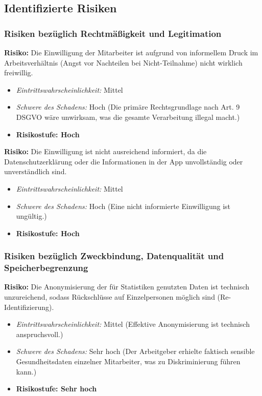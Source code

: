 \documentclass[12pt, a4paper]{article}
\begin{document}
\subsection{Identifizierte Risiken}

\subsubsection{Risiken bezüglich Rechtmäßigkeit und Legitimation}
\textbf{Risiko:} Die Einwilligung der Mitarbeiter ist aufgrund von informellem Druck im Arbeitsverhältnis (Angst vor Nachteilen bei Nicht-Teilnahme) nicht wirklich freiwillig.
\begin{itemize}
    \item \textit{Eintrittswahrscheinlichkeit:} Mittel
    \item \textit{Schwere des Schadens:} Hoch (Die primäre Rechtsgrundlage nach Art. 9 DSGVO wäre unwirksam, was die gesamte Verarbeitung illegal macht.)
    \item \textbf{Risikostufe: Hoch}
\end{itemize}

\textbf{Risiko:} Die Einwilligung ist nicht ausreichend informiert, da die Datenschutzerklärung oder die Informationen in der App unvollständig oder unverständlich sind.
\begin{itemize}
    \item \textit{Eintrittswahrscheinlichkeit:} Mittel
    \item \textit{Schwere des Schadens:} Hoch (Eine nicht informierte Einwilligung ist ungültig.)
    \item \textbf{Risikostufe: Hoch}
\end{itemize}

\subsubsection{Risiken bezüglich Zweckbindung, Datenqualität und Speicherbegrenzung}
\textbf{Risiko:} Die Anonymisierung der für Statistiken genutzten Daten ist technisch unzureichend, sodass Rückschlüsse auf Einzelpersonen möglich sind (Re-Identifizierung).
\begin{itemize}
    \item \textit{Eintrittswahrscheinlichkeit:} Mittel (Effektive Anonymisierung ist technisch anspruchsvoll.)
    \item \textit{Schwere des Schadens:} Sehr hoch (Der Arbeitgeber erhielte faktisch sensible Gesundheitsdaten einzelner Mitarbeiter, was zu Diskriminierung führen kann.)
    \item \textbf{Risikostufe: Sehr hoch}
\end{itemize}
\end{document}
